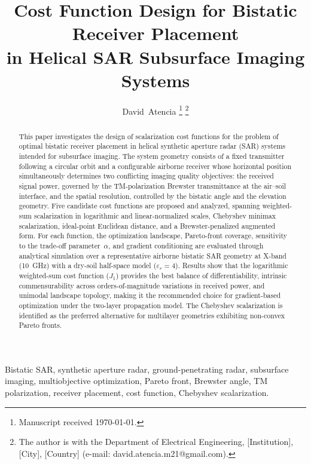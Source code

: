\documentclass[journal]{IEEEtran}
\title{Cost Function Design for Bistatic Receiver Placement\\
       in Helical SAR Subsurface Imaging Systems}
\author{David~Atencia%
  \thanks{Manuscript received \today.}%
  \thanks{The author is with the Department of Electrical Engineering,
          [Institution], [City], [Country]
          (e-mail: david.atencia.m21@gmail.com).}}
\begin{document}

\maketitle

\begin{abstract}
This paper investigates the design of scalarization cost functions for the
problem of optimal bistatic receiver placement in helical synthetic aperture
radar (SAR) systems intended for subsurface imaging. The system geometry
consists of a fixed transmitter following a circular orbit and a configurable
airborne receiver whose horizontal position simultaneously determines two
conflicting imaging quality objectives: the received signal power, governed by
the TM-polarization Brewster transmittance at the air--soil interface, and the
spatial resolution, controlled by the bistatic angle and the elevation geometry.
Five candidate cost functions are proposed and analyzed, spanning weighted-sum
scalarization in logarithmic and linear-normalized scales, Chebyshev minimax
scalarization, ideal-point Euclidean distance, and a Brewster-penalized
augmented form. For each function, the optimization landscape, Pareto-front
coverage, sensitivity to the trade-off parameter~$\alpha$, and gradient
conditioning are evaluated through analytical simulation over a representative
airborne bistatic SAR geometry at X-band (10~GHz) with a dry-soil half-space
model ($\varepsilon_r = 4$). Results show that the logarithmic weighted-sum
cost function ($J_1$) provides the best balance of differentiability, intrinsic
commensurability across orders-of-magnitude variations in received power, and
unimodal landscape topology, making it the recommended choice for
gradient-based optimization under the two-layer propagation model. The
Chebyshev scalarization is identified as the preferred alternative for
multilayer geometries exhibiting non-convex Pareto fronts.
\end{abstract}

\begin{IEEEkeywords}
Bistatic SAR, synthetic aperture radar, ground-penetrating radar, subsurface
imaging, multiobjective optimization, Pareto front, Brewster angle, TM
polarization, receiver placement, cost function, Chebyshev scalarization.
\end{IEEEkeywords}
\end{document}
